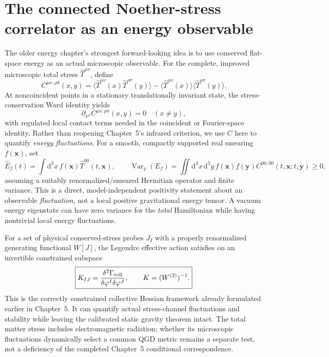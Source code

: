 \documentclass[11pt,a4paper]{article}
\theoremstyle{definition}\newtheorem{definition}[theorem]{Definition}
\theoremstyle{remark}\newtheorem{remark}[theorem]{Remark}
\newcommand{\dd}{\mathrm d}
\begin{document}
\section{The connected Noether-stress correlator as an energy observable}
\label{sec:v13-correlator}
The older energy chapter's strongest forward-looking idea is to use
conserved flat-space energy as an actual microscopic observable.
For the complete, improved microscopic total stress
$\widehat T^{\mu\nu}$, define
\begin{equation}\label{eq:v13-C}
\boxed{C^{\mu\nu,\rho\sigma}(x,y)
=\langle\widehat T^{\mu\nu}(x)\widehat T^{\rho\sigma}(y)\rangle
-\langle\widehat T^{\mu\nu}(x)\rangle\langle\widehat T^{\rho\sigma}(y)\rangle.}
\end{equation}
At noncoincident points in a stationary translationally invariant
state, the stress-conservation Ward identity yields
\begin{equation}\label{eq:v13-Ward}
\boxed{\partial_{x^\mu}C^{\mu\nu,\rho\sigma}(x,y)=0
\quad(x\ne y),}
\end{equation}
with regulated local contact terms needed in the coincident or
Fourier-space identity.  Rather than reopening Chapter~5's infrared
criterion, we use $C$ here to quantify \emph{energy fluctuations}.
For a smooth, compactly supported real smearing $f(\bm x)$, set
\begin{equation}\label{eq:v13-variance}
\widehat E_f(t)=\int\!\dd^3x\, f(\bm x)
\widehat T^{00}(t,\bm x),\qquad
\boxed{\operatorname{Var}_\varrho(E_f)
=\iint\!\dd^3x\,\dd^3y\,f(\bm x)f(\bm y)
C^{00,00}(t,\bm x;t,\bm y)\ge0,}
\end{equation}
assuming a suitably renormalized/smeared Hermitian operator and
finite variance.  This is a direct, model-independent positivity
statement about an observable \emph{fluctuation}, not a local
positive gravitational energy tensor.  A vacuum energy eigenstate
can have zero variance for the \emph{total} Hamiltonian while
having nontrivial local energy fluctuations.

For a set of physical conserved-stress probes $J_I$ with a properly
renormalized generating functional $W[J]$, the Legendre effective
action satisfies on an invertible constrained subspace
\begin{equation}\label{eq:v13-Hessian}
\boxed{K_{IJ}=\frac{\delta^2\Gamma_{\rm coll}}
{\delta\varphi^I\delta\varphi^J},\qquad
K=(W^{(2)})^{-1}.}
\end{equation}
This is the correctly constrained collective Hessian framework
already formulated earlier in Chapter~5.  It can quantify actual
stress-channel fluctuations and stability while leaving the
calibrated static gravity theorem intact.  The total matter stress
includes electromagnetic radiation; whether its microscopic
fluctuations dynamically select a common QGD metric remains a
separate test, not a deficiency of the completed Chapter~5
conditional correspondence.
\end{document}
